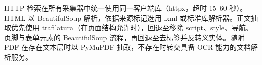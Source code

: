 \documentclass[11pt]{article}
\begin{document}
HTTP {\cjkfont 检\allowbreak 索\allowbreak 在\allowbreak 所\allowbreak 有\allowbreak 采\allowbreak 集\allowbreak 器\allowbreak 中\allowbreak 统\allowbreak 一\allowbreak 使\allowbreak 用\allowbreak 同\allowbreak 一\allowbreak 客\allowbreak 户\allowbreak 端\allowbreak 库\allowbreak （}httpx{\cjkfont ，\allowbreak 超\allowbreak 时} 15--60 {\cjkfont 秒\allowbreak ）\allowbreak 。}HTML {\cjkfont 以} BeautifulSoup {\cjkfont 解\allowbreak 析\allowbreak ，\allowbreak 依\allowbreak 据\allowbreak 来\allowbreak 源\allowbreak 标\allowbreak 记\allowbreak 选\allowbreak 用} lxml {\cjkfont 或\allowbreak 标\allowbreak 准\allowbreak 库\allowbreak 解\allowbreak 析\allowbreak 器\allowbreak 。\allowbreak 正\allowbreak 文\allowbreak 抽\allowbreak 取\allowbreak 优\allowbreak 先\allowbreak 使\allowbreak 用} trafilatura{\cjkfont （\allowbreak 在\allowbreak 页\allowbreak 面\allowbreak 结\allowbreak 构\allowbreak 允\allowbreak 许\allowbreak 时\allowbreak ）\allowbreak ，\allowbreak 回\allowbreak 退\allowbreak 至\allowbreak 移\allowbreak 除} script{\cjkfont 、}style{\cjkfont 、\allowbreak 导\allowbreak 航\allowbreak 、\allowbreak 页\allowbreak 脚\allowbreak 与\allowbreak 表\allowbreak 单\allowbreak 元\allowbreak 素\allowbreak 的} BeautifulSoup {\cjkfont 流\allowbreak 程\allowbreak ，\allowbreak 再\allowbreak 回\allowbreak 退\allowbreak 至\allowbreak 去\allowbreak 标\allowbreak 签\allowbreak 并\allowbreak 反\allowbreak 转\allowbreak 义\allowbreak 实\allowbreak 体\allowbreak 。\allowbreak 随\allowbreak 附} PDF {\cjkfont 在\allowbreak 存\allowbreak 在\allowbreak 文\allowbreak 本\allowbreak 层\allowbreak 时\allowbreak 以} PyMuPDF {\cjkfont 抽\allowbreak 取\allowbreak ，\allowbreak 不\allowbreak 存\allowbreak 在\allowbreak 时\allowbreak 转\allowbreak 交\allowbreak 具\allowbreak 备} OCR {\cjkfont 能\allowbreak 力\allowbreak 的\allowbreak 文\allowbreak 档\allowbreak 解\allowbreak 析\allowbreak 服\allowbreak 务\allowbreak 。}
\end{document}
